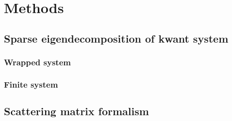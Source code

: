 \chapter{Methods}

\section{Sparse eigendecomposition of kwant system}
	\subsection{Wrapped system}
	\subsection{Finite system}

\section{Scattering matrix formalism}
